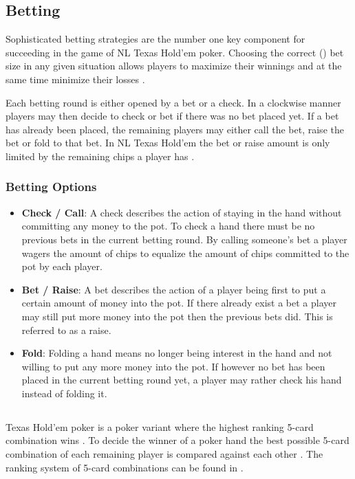 \subsection{Betting}
Sophisticated betting strategies are the number one key component for succeeding in the game of NL Texas Hold'em poker. Choosing the correct () bet size in any given situation allows players to maximize their winnings and at the same time minimize their losses \cite{master_nuno}. \par
Each betting round is either opened by a bet or a check. In a clockwise manner players may then decide to check or bet if there was no bet placed yet. If a bet has already been placed, the remaining players may either call the bet, raise the bet or fold to that bet. In NL Texas Hold'em the bet or raise amount is only limited by the remaining chips a player has \cite{poker_dummies}. \par
\subsubsection{Betting Options}
\begin{itemize}
\item \textbf{Check / Call}:
A check describes the action of staying in the hand without committing any money to the pot. To check a hand there must be no previous bets in the current betting round. By calling someone's bet a player wagers the amount of chips to equalize the amount of chips committed to the pot by each player.\\ 
\item \textbf{Bet / Raise}:
A bet describes the action of a player being first to put a certain amount of money into the pot. If there already exist a bet a player may still put more money into the pot then the previous bets did. This is referred to as a raise. \\ 
\item \textbf{Fold}:
Folding a hand means no longer being interest in the hand and not willing to put any more money into the pot. If however no bet has been placed in the current betting round yet, a player may rather check his hand instead of folding it. 
\end{itemize}
\cite{review, poker_dummies} 
\subsection{}
Texas Hold'em poker is a poker variant where the highest ranking 5-card combination wins \cite{poker_dummies}. To decide the winner of a poker hand the best possible 5-card combination of each remaining player is compared against each other \cite{pena}. The ranking system of 5-card combinations can be found in . 
